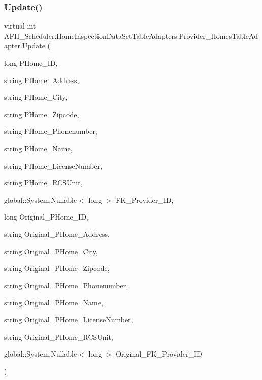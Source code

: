 \subsubsection{Update()\hspace{0.1cm}{\footnotesize\ttfamily [5/6]}}
{\footnotesize\ttfamily virtual int A\+F\+H\+\_\+\+Scheduler.\+Home\+Inspection\+Data\+Set\+Table\+Adapters.\+Provider\+\_\+\+Homes\+Table\+Adapter.\+Update (\begin{DoxyParamCaption}\item[{long}]{P\+Home\+\_\+\+ID,  }\item[{string}]{P\+Home\+\_\+\+Address,  }\item[{string}]{P\+Home\+\_\+\+City,  }\item[{string}]{P\+Home\+\_\+\+Zipcode,  }\item[{string}]{P\+Home\+\_\+\+Phonenumber,  }\item[{string}]{P\+Home\+\_\+\+Name,  }\item[{string}]{P\+Home\+\_\+\+License\+Number,  }\item[{string}]{P\+Home\+\_\+\+R\+C\+S\+Unit,  }\item[{global\+::\+System.\+Nullable$<$ long $>$}]{F\+K\+\_\+\+Provider\+\_\+\+ID,  }\item[{long}]{Original\+\_\+\+P\+Home\+\_\+\+ID,  }\item[{string}]{Original\+\_\+\+P\+Home\+\_\+\+Address,  }\item[{string}]{Original\+\_\+\+P\+Home\+\_\+\+City,  }\item[{string}]{Original\+\_\+\+P\+Home\+\_\+\+Zipcode,  }\item[{string}]{Original\+\_\+\+P\+Home\+\_\+\+Phonenumber,  }\item[{string}]{Original\+\_\+\+P\+Home\+\_\+\+Name,  }\item[{string}]{Original\+\_\+\+P\+Home\+\_\+\+License\+Number,  }\item[{string}]{Original\+\_\+\+P\+Home\+\_\+\+R\+C\+S\+Unit,  }\item[{global\+::\+System.\+Nullable$<$ long $>$}]{Original\+\_\+\+F\+K\+\_\+\+Provider\+\_\+\+ID }\end{DoxyParamCaption})\hspace{0.3cm}{\ttfamily [virtual]}}

\mbox{\label{class_a_f_h___scheduler_1_1_home_inspection_data_set_table_adapters_1_1_provider___homes_table_adapter_a9b6a4ee5cfaaaa85f0e3fe94e2472c6d}} 
